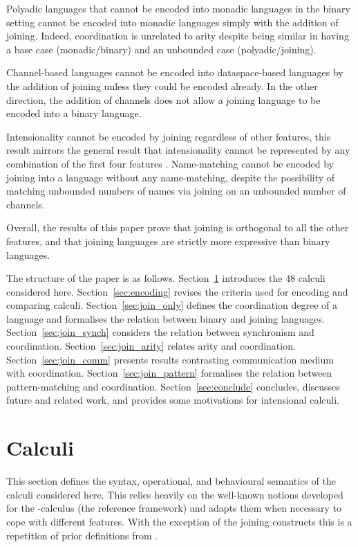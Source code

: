 \documentclass[submission,copyright,creativecommons]{eptcs}
\begin{document}
Polyadic languages that cannot be encoded into monadic languages in the binary setting cannot be
encoded into monadic languages simply with the addition of joining. Indeed, coordination is
unrelated to arity despite being similar in having a base case (monadic/binary) and an unbounded
case (polyadic/joining).

Channel-based languages cannot be encoded into dataspace-based languages by the addition of joining
unless they could be encoded already. In the other direction, the addition of channels does not allow
a joining language to be encoded into a binary language.

Intensionality cannot be encoded by joining regardless of other features, this result mirrors
the general result that intensionality cannot be represented by any combination of the first four
features \cite{givenwilson:hal-01026301}.
Name-matching cannot be encoded by joining into a
language without any name-matching, despite the possibility of matching unbounded numbers of
names via joining on an unbounded number of channels.

Overall, the results of this paper prove that joining is orthogonal to all the other features,
and that joining languages are strictly more expressive than binary languages.

The structure of the paper is as follows.
Section~\ref{sec:calculi} introduces the 48 calculi considered here.
Section~\ref{sec:encoding} revises the criteria used for encoding and comparing calculi.
Section~\ref{sec:join_only} defines the coordination degree of a language and formalises the
relation between binary and joining languages.
Section~\ref{sec:join_synch} considers the relation between synchronism and coordination.
Section~\ref{sec:join_arity} relates arity and coordination.
Section~\ref{sec:join_comm} presents results contrasting communication medium with coordination.
Section~\ref{sec:join_pattern} formalises the relation between pattern-matching and coordination.
Section~\ref{sec:conclude} concludes, discusses future and related work, and provides some motivations
for intensional calculi.

\section{Calculi}
\label{sec:calculi}

This section defines the syntax, operational, and behavioural semantics of the calculi
considered here. This relies heavily on the well-known notions developed for the
-calculus (the reference framework) and adapts them when necessary to cope with
different features. With the exception of the joining constructs this is a repetition
of prior definitions from \cite{givenwilson:hal-01026301}.
\end{document}
